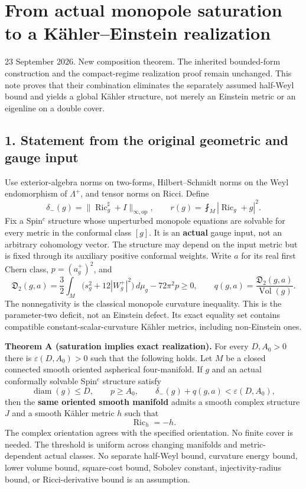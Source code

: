 \documentclass[
  11pt,
]{article}
\author{}
\date{}
\begin{document}
\hypertarget{from-actual-monopole-saturation-to-a-kuxe4hlereinstein-realization}{%
\section{From actual monopole saturation to a Kähler--Einstein
realization}\label{from-actual-monopole-saturation-to-a-kuxe4hlereinstein-realization}}

23 September 2026. New composition theorem. The inherited bounded-form
construction and the compact-regime realization proof remain unchanged.
This note proves that their combination eliminates the separately
assumed half-Weyl bound and yields a global Kähler structure, not merely
an Einstein metric or an eigenline on a double cover.

\hypertarget{statement-from-the-original-geometric-and-gauge-input}{%
\subsection{1. Statement from the original geometric and gauge
input}\label{statement-from-the-original-geometric-and-gauge-input}}

Use exterior-algebra norms on two-forms, Hilbert--Schmidt norms on the
Weyl endomorphism of \(\Lambda^+\), and tensor norms on Ricci. Define \[
 \delta_-(g)=\|\operatorname{Ric}_g^\sharp+I\|_{\infty,\mathrm{op}},
 \qquad r(g)=\fint_M|\operatorname{Ric}_g+g|^2.
 \tag{1}
\] Fix a Spin\(^c\) structure whose unperturbed monopole equations are
solvable for every metric in the conformal class \([g]\). It is an
\textbf{actual} gauge input, not an arbitrary cohomology vector. The
structure may depend on the input metric but is fixed through its
auxiliary positive conformal weights. Write \(a\) for its real first
Chern class, \(p=(a_g^+)^2\), and \[
 \mathfrak D_2(g,a)
  =\frac32\int_M\bigl(s_g^2+12|W_g^+|^2\bigr)\,d\mu_g
           -72\pi^2p\ge0,
 \qquad q(g,a)=\frac{\mathfrak D_2(g,a)}{\operatorname{Vol}(g)}.
 \tag{2}
\] The nonnegativity is the classical monopole curvature inequality.
This is the parameter-two deficit, not an Einstein defect. Its exact
equality set contains compatible constant-scalar-curvature Kähler
metrics, including non-Einstein ones.

\textbf{Theorem A (saturation implies exact realization).} For every
\(D,A_0>0\) there is \(\varepsilon(D,A_0)>0\) such that the following
holds. Let \(M\) be a closed connected smooth oriented aspherical
four-manifold. If \(g\) and an actual conformally solvable Spin\(^c\)
structure satisfy \[
 \operatorname{diam}(g)\le D,\qquad p\ge A_0,
 \qquad \delta_-(g)+q(g,a)<\varepsilon(D,A_0),
 \tag{3}
\] then the \textbf{same oriented smooth manifold} admits a smooth
complex structure \(J\) and a smooth Kähler metric \(h\) such that \[
                          \operatorname{Ric}_h=-h.
 \tag{4}
\] The complex orientation agrees with the specified orientation. No
finite cover is needed. The threshold is uniform across changing
manifolds and metric-dependent actual classes. No separate half-Weyl
bound, curvature energy bound, lower volume bound, square-cost bound,
Sobolev constant, injectivity-radius bound, or Ricci-derivative bound is
an assumption.
\end{document}
